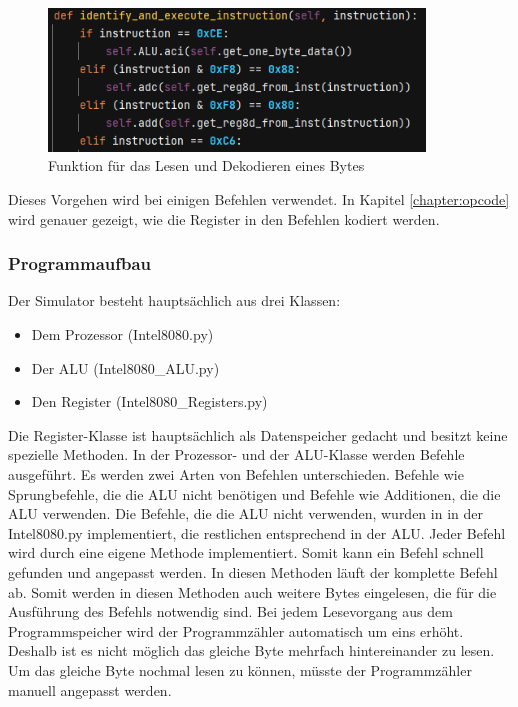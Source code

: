 \documentclass[12pt]{article}
\begin{document}
\begin{figure}[h]
\centering
\includegraphics[width=10cm]{Bilder/ReadInstruction}
\caption{Funktion für das Lesen und Dekodieren eines Bytes}
\label{fig:ReadInstruction}
\end{figure}

\noindent
Dieses Vorgehen wird bei einigen Befehlen verwendet. In Kapitel \ref{chapter:opcode} wird genauer gezeigt, wie die Register in den Befehlen kodiert werden.


\subsubsection{Programmaufbau}
\label{chapter:MPS_aufbau}

Der Simulator besteht hauptsächlich aus drei Klassen:

\begin{itemize}
\item Dem Prozessor (Intel8080.py)
\item Der ALU (Intel8080\_ALU.py)
\item Den Register (Intel8080\_Registers.py)
\end{itemize} 

\noindent
Die Register-Klasse ist hauptsächlich als Datenspeicher gedacht und besitzt keine spezielle Methoden. In der Prozessor- und der ALU-Klasse werden Befehle ausgeführt. Es werden zwei Arten von Befehlen unterschieden. Befehle wie Sprungbefehle, die die ALU nicht benötigen und Befehle wie Additionen, die die ALU verwenden. 
Die Befehle, die die ALU nicht verwenden, wurden in in der Intel8080.py implementiert, die restlichen entsprechend in der ALU. Jeder Befehl wird durch eine eigene Methode implementiert. Somit kann ein Befehl schnell gefunden und angepasst werden. In diesen Methoden läuft der komplette Befehl ab. Somit werden in diesen Methoden auch weitere Bytes eingelesen, die für die Ausführung des Befehls notwendig sind.
Bei jedem Lesevorgang aus dem Programmspeicher wird der Programmzähler automatisch um eins erhöht. Deshalb ist es nicht möglich das gleiche Byte mehrfach hintereinander zu lesen. Um das gleiche Byte nochmal lesen zu können, müsste der Programmzähler manuell angepasst werden.
\end{document}
